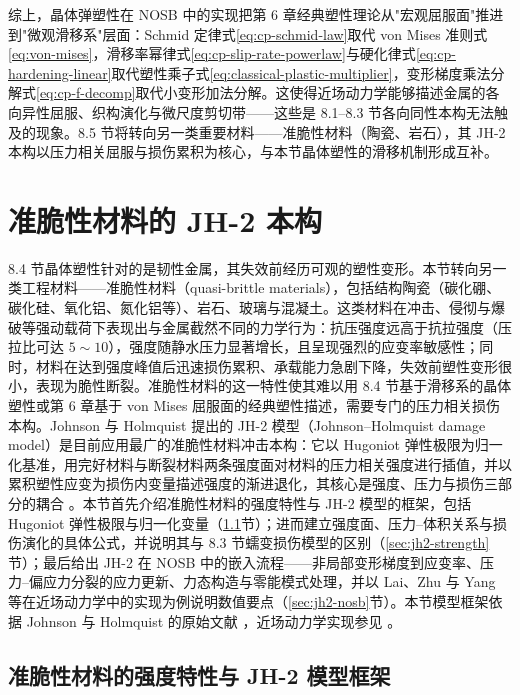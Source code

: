 综上，晶体弹塑性在 NOSB 中的实现把第 6 章经典塑性理论从"宏观屈服面"推进到"微观滑移系"层面：Schmid 定律式\eqref{eq:cp-schmid-law}取代 von Mises 准则式\eqref{eq:von-mises}，滑移率幂律式\eqref{eq:cp-slip-rate-powerlaw}与硬化律式\eqref{eq:cp-hardening-linear}取代塑性乘子式\eqref{eq:classical-plastic-multiplier}，变形梯度乘法分解式\eqref{eq:cp-f-decomp}取代小变形加法分解。这使得近场动力学能够描述金属的各向异性屈服、织构演化与微尺度剪切带——这些是 8.1--8.3 节各向同性本构无法触及的现象。8.5 节将转向另一类重要材料——准脆性材料（陶瓷、岩石），其 JH-2 本构以压力相关屈服与损伤累积为核心，与本节晶体塑性的滑移机制形成互补。

\section{准脆性材料的 JH-2 本构}

8.4 节晶体塑性针对的是韧性金属，其失效前经历可观的塑性变形。本节转向另一类工程材料——准脆性材料（quasi-brittle materials），包括结构陶瓷（碳化硼、碳化硅、氧化铝、氮化铝等）、岩石、玻璃与混凝土。这类材料在冲击、侵彻与爆破等强动载荷下表现出与金属截然不同的力学行为：抗压强度远高于抗拉强度（压拉比可达 $5\sim10$），强度随静水压力显著增长，且呈现强烈的应变率敏感性；同时，材料在达到强度峰值后迅速损伤累积、承载能力急剧下降，失效前塑性变形很小，表现为脆性断裂。准脆性材料的这一特性使其难以用 8.4 节基于滑移系的晶体塑性或第 6 章基于 von Mises 屈服面的经典塑性描述，需要专门的压力相关损伤本构。Johnson 与 Holmquist 提出的 JH-2 模型（Johnson--Holmquist damage model）是目前应用最广的准脆性材料冲击本构：它以 Hugoniot 弹性极限为归一化基准，用完好材料与断裂材料两条强度面对材料的压力相关强度进行插值，并以累积塑性应变为损伤内变量描述强度的渐进退化，其核心是强度、压力与损伤三部分的耦合 \cite{JohnsonHolmquist1994}。本节首先介绍准脆性材料的强度特性与 JH-2 模型的框架，包括 Hugoniot 弹性极限与归一化变量（\ref{sec:jh2-framework}节）；进而建立强度面、压力--体积关系与损伤演化的具体公式，并说明其与 8.3 节蠕变损伤模型的区别（\ref{sec:jh2-strength}节）；最后给出 JH-2 在 NOSB 中的嵌入流程——非局部变形梯度到应变率、压力--偏应力分裂的应力更新、力态构造与零能模式处理，并以 Lai、Zhu 与 Yang 等在近场动力学中的实现为例说明数值要点（\ref{sec:jh2-nosb}节）。本节模型框架依据 Johnson 与 Holmquist 的原始文献 \cite{JohnsonHolmquist1994,JohnsonHolmquist1999,HolmquistJohnson2002,HolmquistTempletonBishnoi2001,JohnsonHolmquistBeissel2003}，近场动力学实现参见 \cite{Lai2018,ZhuZhao2021,YangGuZhangXia2021,CanSillingGuven2025}。

\subsection{准脆性材料的强度特性与 JH-2 模型框架}\label{sec:jh2-framework}

